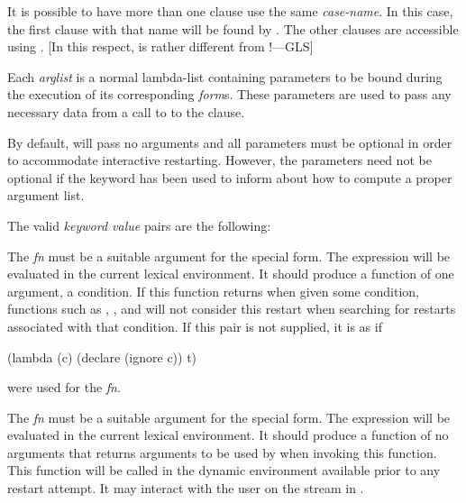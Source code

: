 \begin{defmac}
  It is possible to have more than one clause use the same \emph{case-name}.
  In this case, the first clause with that name will be found by
  . The other clauses are accessible using .
  [In this respect,  is rather different from !---GLS]

  Each \emph{arglist} is a normal lambda-list containing parameters
  to be bound during the execution of 
  its corresponding \emph{form\/}s. These parameters are used to pass any necessary 
  data from a call to  to the  clause.

  By default,  will pass no arguments and
  all parameters must be optional in order to accommodate interactive
  restarting. However, the parameters need not be optional if the
   keyword has been used to inform 
  about how to compute a proper argument list.

  The valid \emph{keyword value} pairs are the following:
\begin{flushdesc}
\item[\cd{:test \emph{fn}}]

    The \emph{fn} must be a suitable argument for the  special form. The
    expression  will be evaluated in the current lexical
    environment. It should produce a function of one argument, a condition.
    If this function returns  when given some condition, functions such as
, , and 
will not consider this restart when searching for restarts associated with
that condition.  If this pair is not supplied, it is as if
\begin{lisp}
(lambda (c) (declare (ignore c)) t)
\end{lisp}
were used for the \emph{fn}.

\item[\cd{:interactive \emph{fn}}]

    The \emph{fn} must be a suitable argument for the  special form. The
    expression  will be evaluated in the current lexical
    environment. It should produce a function of no arguments that 
    returns arguments to be used by  when
    invoking this function. This function will be called in the dynamic
    environment available prior to any restart attempt. It may interact with the user
    on the stream in .


\end{flushdesc}
\end{defmac}
